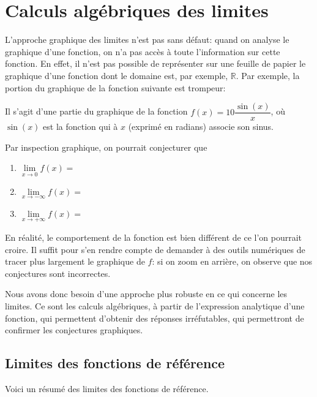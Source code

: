 \documentclass[a4paper,12pt]{report}
\newcommand{\IR}{\mathbb{R}}
\newcommand{\pinf}{+\infty}
\newcommand{\minf}{-\infty}
\begin{document}
\section{Calculs algébriques des limites}
\label{sec:orge214a73}
L'approche graphique des limites n'est pas sans défaut: quand on
analyse le graphique d'une fonction, on n'a pas accès à toute
l'information sur cette fonction. En effet, il n'est pas possible de
représenter sur une feuille de papier le graphique d'une fonction dont
le domaine est, par exemple, \(\IR\). Par exemple, la portion du
graphique de la fonction suivante est trompeur:

\begin{center}

\end{center}

Il s'agit d'une partie du graphique de la fonction
\(f(x)=10\dfrac{\sin(x)}{x}\), où \(\sin(x)\) est la fonction qui à \(x\)
(exprimé en radians) associe son sinus.

Par inspection graphique, on pourrait conjecturer que
\begin{enumerate}
\item \(\lim\limits_{x\to 0}f(x)=\) \dotfill
\item \(\lim\limits_{x\to \minf}f(x)=\) \dotfill
\item \(\lim\limits_{x\to \pinf}f(x)=\) \dotfill
\end{enumerate}

En réalité, le comportement de la fonction est bien différent de ce
l'on pourrait croire. Il suffit pour s'en rendre compte de demander à
des outils numériques de tracer plus largement le graphique de \(f\): si on zoom
en arrière, on observe que nos conjectures sont incorrectes.

Nous avons donc besoin d'une approche plus robuste en ce qui concerne
les limites. Ce sont les calculs algébriques, à partir de l'expression
analytique d'une fonction, qui permettent d'obtenir des réponses
irréfutables, qui permettront de confirmer les conjectures graphiques.
\subsection{Limites des fonctions de référence}
\label{sec:org420a565}

Voici un résumé des limites des fonctions de référence.
\end{document}
